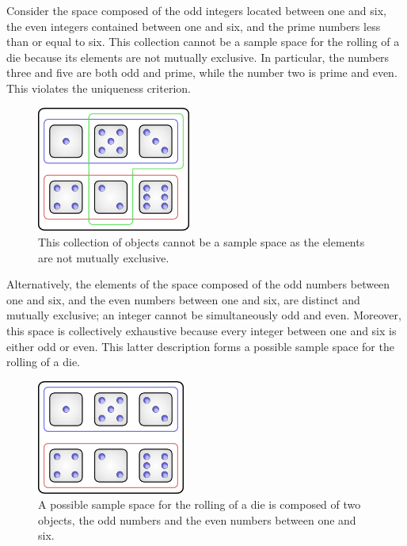 \begin{example}
Consider the space composed of the odd integers located between one and six, the even integers contained between one and six, and the prime numbers less than or equal to six.
This collection cannot be a sample space for the rolling of a die because its elements are not mutually exclusive.
In particular, the numbers three and five are both odd and prime, while the number two is prime and even.
This violates the uniqueness criterion.

\begin{figure}[htb!]
\begin{center}
\includegraphics[height=4.125cm]{Figures/2Chapter/nonadmissiblespace}
\caption{This collection of objects cannot be a sample space as the elements are not mutually exclusive.}
\end{center}
\end{figure}

Alternatively, the elements of the space composed of the odd numbers between one and six, and the even numbers between one and six, are distinct and mutually exclusive;
an integer cannot be simultaneously odd and even.
Moreover, this space is collectively exhaustive because every integer between one and six is either odd or even.
This latter description forms a possible sample space for the rolling of a die.

\begin{figure}[htb!]
\begin{center}
\includegraphics[height=3.75cm]{Figures/2Chapter/admissiblespace}
\end{center}
\caption{A possible sample space for the rolling of a die is composed of two objects, the odd numbers and the even numbers between one and six.}
\end{figure}
\end{example}


